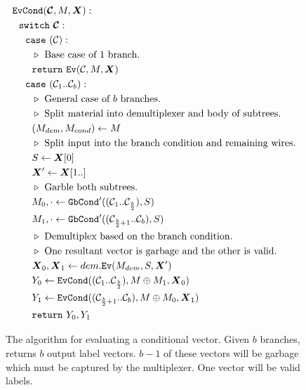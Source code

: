 \begin{figure}
  \begin{align*}
    &\evcond(\vec{\cir}, M, \vec{X}):\\
    &~~\switch~\vec{\cir}:\\
    &~~~~\ccase~(\cir):\\
    &~~~~~~\codecomment{Base case of $1$ branch.}\\
    &~~~~~~\creturn~\ev(\cir, M, \vec{X})\\
    &~~~~\ccase~(\cir_1..\cir_b):\\
    &~~~~~~\codecomment{General case of $b$ branches.}\\
    &~~~~~~\codecomment{Split material into demultiplexer and body of subtrees.}\\
    &~~~~~~(M_{dem}, M_{cond}) \gets M\\
    &~~~~~~\codecomment{Split input into the branch condition and remaining wires.}\\
    &~~~~~~S \gets \vec{X}[0]\\
    &~~~~~~\vec{X}' \gets \vec{X}[1..]\\
    &~~~~~~\codecomment{Garble both subtrees.}\\
    &~~~~~~M_0,\cdot \gets \gbcond'((\cir_1..\cir_{\frac{b}{2}}), S)\\
    &~~~~~~M_1,\cdot \gets \gbcond'((\cir_{\frac{b}{2}+1}..\cir_b), S)\\
    &~~~~~~\codecomment{Demultiplex based on the branch condition.}\\
    &~~~~~~\codecomment{One resultant vector is garbage and the other is valid.}\\
    &~~~~~~\vec{X}_0, \vec{X}_1 \gets dem.\ev(M_{dem}, S, \vec{X}')\\
    &~~~~~~Y_0 \gets \evcond((\cir_1..\cir_{\frac{b}{2}}), M \oplus M_1, \vec{X}_0)\\
    &~~~~~~Y_1 \gets \evcond((\cir_{\frac{b}{2}+1}..\cir_b), M \oplus M_0, \vec{X}_1)\\
    &~~~~~~\creturn~Y_0, Y_1
  \end{align*}
  \caption{%
    The algorithm for evaluating a conditional vector.
    Given $b$ branches, \evcond returns $b$ output label vectors.
    $b-1$ of these vectors will be garbage which must be captured by
    the multiplexer.
    One vector will be valid labels.
  }
\end{figure}
